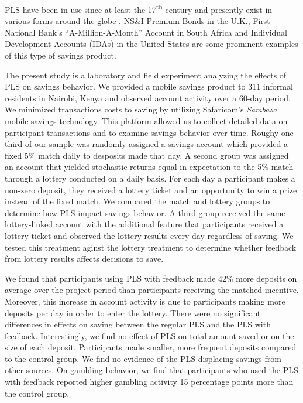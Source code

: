 \documentclass[11pt]{article}
\begin{document}

	PLS have been in use since at least the 17\textsuperscript{th} century and presently exist in various forms around the globe . NS\&I Premium Bonds in the U.K., First National Bank's ``A-Million-A-Month'' Account in South Africa and Individual Development Accounts (IDAs) in the United States are some prominent examples of this type of savings product.


	The present study is a laboratory and field experiment analyzing the effects of PLS on savings behavior. We provided a mobile savings product to 311 informal residents in Nairobi, Kenya and observed account activity over a 60-day period. We minimized transactions costs to saving by utilizing Safaricom's \textit{Sambaza} mobile savings technology. This platform allowed us to collect detailed data on participant transactions and to examine savings behavior over time. Roughy one-third of our sample was randomly assigned a savings account which provided a fixed 5\% match daily to desposits made that day. A second group was assigned an account that yielded stochastic returns equal in expectation to the 5\% match through a lottery conducted on a daily basis. For each day a participant makes a non-zero deposit, they received a lottery ticket and an opportunity to win a prize instead of the fixed match. We compared the match and lottery groups to determine how PLS impact savings behavior. A third group received the same lottery-linked account with the additional feature that participants received a lottery ticket and observed the lottery results every day regardless of saving. We tested this treatment aginst the lottery treatment to determine whether feedback from lottery results affects decisions to save.


	We found that participants using PLS with feedback made 42\% more deposits on average over the project period than participants receiving the matched incentive. Moreover, this increase in account activity is due to participants making more deposits per day in order to enter the lottery. There were no significant differences in effects on saving between the regular PLS and the PLS with feedback. Interestingly, we find no effect of PLS on total amount saved or on the size of each deposit. Participants made smaller, more frequent deposits compared to the control group. We find no evidence of the PLS displacing savings from other sources. On gambling behavior, we find that participants who used the PLS with feedback reported higher gambling activity 15 percentage points more than the control group.
\end{document}
